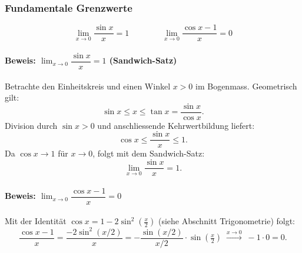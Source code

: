 \documentclass[../../zusammenfassung_AN.tex]{subfiles}
\begin{document}
	
	\subsubsection{Fundamentale Grenzwerte}
	
	\begin{tcolorbox}[dglbox, title={Wichtige Grenzwerte}]
		\[
		\lim_{x\to 0} \frac{\sin x}{x} = 1
		\qquad\qquad
		\lim_{x\to 0} \frac{\cos x - 1}{x} = 0
		\]
	\end{tcolorbox}
	
	\paragraph{Beweis: $\lim_{x\to 0}\dfrac{\sin x}{x}=1$ \quad (Sandwich-Satz)}
	
	Betrachte den Einheitskreis und einen Winkel $x>0$ im Bogenmass.
	Geometrisch gilt:
	\[
	\sin x \le x \le \tan x = \frac{\sin x}{\cos x}.
	\]
	Division durch $\sin x > 0$ und anschliessende Kehrwertbildung liefert:
	\[
	\cos x \le \frac{\sin x}{x} \le 1.
	\]
	Da $\cos x \to 1$ für $x\to 0$, folgt mit dem Sandwich-Satz:
	\[
	\lim_{x\to 0}\frac{\sin x}{x} = 1.
	\]
	
	\paragraph{Beweis: $\lim_{x\to 0}\dfrac{\cos x-1}{x}=0$}
	
	Mit der Identität $\cos x = 1-2\sin^2\!\left(\tfrac{x}{2}\right)$
	(siehe Abschnitt Trigonometrie) folgt:
	\[
	\frac{\cos x-1}{x}
	= \frac{-2\sin^2(x/2)}{x}
	= -\frac{\sin(x/2)}{x/2}\cdot\sin\!\left(\tfrac{x}{2}\right)
	\;\xrightarrow{x\to 0}\; -1\cdot 0 = 0.
	\]
	
\end{document}
